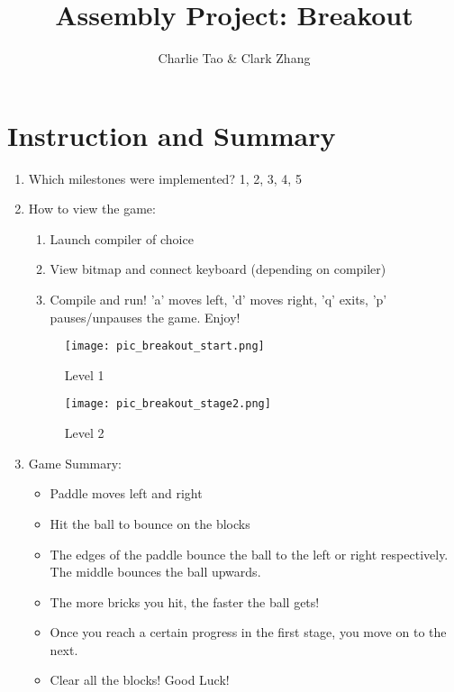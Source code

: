 \documentclass{article}
\title{Assembly Project: Breakout}
\author{Charlie Tao & Clark Zhang}
\begin{document}
\maketitle

\section{Instruction and Summary}

\begin{enumerate}

    \item Which milestones were implemented? 
    1, 2, 3, 4, 5

    \item How to view the game:
    
    \begin{enumerate}

    \item Launch compiler of choice
    \item View bitmap and connect keyboard (depending on compiler)
    \item Compile and run! 'a' moves left, 'd' moves right, 'q' exits, 'p' pauses/unpauses the game. Enjoy!


    \end{enumerate}

    

\begin{figure}[ht!]
    \centering
    \texttt{[image: pic\_breakout\_start.png]}
    \caption{Level 1}
    \label{Instructions}
\end{figure}

\begin{figure}[ht!]
    \centering
    \texttt{[image: pic\_breakout\_stage2.png]}
    \caption{Level 2}
    \label{Instructions}
\end{figure}

\item Game Summary:
\begin{itemize}
\item Paddle moves left and right
\item Hit the ball to bounce on the blocks
\item The edges of the paddle bounce the ball to the left or right respectively. The middle bounces the ball upwards. 
\item The more bricks you hit, the faster the ball gets!
\item Once you reach a certain progress in the first stage, you move on to the next. 
\item Clear all the blocks! Good Luck!
\end{itemize}

    
\end{enumerate}
\end{document}
